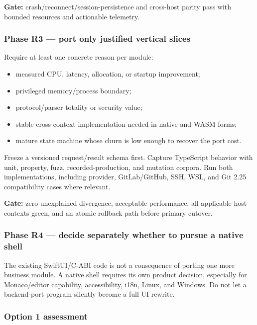 \documentclass[
  10pt,
  letterpaper,
]{article}
\providecommand{\tightlist}{%
  \setlength{\itemsep}{0pt}\setlength{\parskip}{0pt}}
\begin{document}
\textbf{Gate:} crash/reconnect/session-persistence and cross-host parity
pass with bounded resources and actionable telemetry.

\subsubsection{Phase R3 --- port only justified vertical
slices}\label{phase-r3--port-only-justified-vertical-slices}

Require at least one concrete reason per module:

\begin{itemize}
\tightlist
\item
  measured CPU, latency, allocation, or startup improvement;
\item
  privileged memory/process boundary;
\item
  protocol/parser totality or security value;
\item
  stable cross-context implementation needed in native and WASM forms;
\item
  mature state machine whose churn is low enough to recover the port
  cost.
\end{itemize}

Freeze a versioned request/result schema first. Capture TypeScript
behavior with unit, property, fuzz, recorded-production, and mutation
corpora. Run both implementations, including provider, GitLab/GitHub,
SSH, WSL, and Git 2.25 compatibility cases where relevant.

\textbf{Gate:} zero unexplained divergence, acceptable performance, all
applicable host contexts green, and an atomic rollback path before
primary cutover.

\subsubsection{Phase R4 --- decide separately whether to pursue a native
shell}\label{phase-r4--decide-separately-whether-to-pursue-a-native-shell}

The existing SwiftUI/C-ABI code is not a consequence of porting one more
business module. A native shell requires its own product decision,
especially for Monaco/editor capability, accessibility, i18n, Linux, and
Windows. Do not let a backend-port program silently become a full UI
rewrite.

\subsubsection{Option 1 assessment}\label{option-1-assessment}
\end{document}
